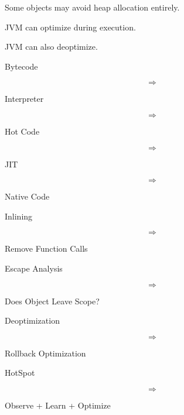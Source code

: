 \documentclass[11pt,a4paper]{book}
\begin{document}

\begin{rosettarule}

Some objects may avoid heap
allocation entirely.

\end{rosettarule}


\begin{rosettarule}

JVM can optimize during execution.

\end{rosettarule}


\begin{rosettarule}

JVM can also deoptimize.

\end{rosettarule}


\begin{compressionbox}

Bytecode

\[
\Rightarrow
\]

Interpreter

\[
\Rightarrow
\]

Hot Code

\[
\Rightarrow
\]

JIT

\[
\Rightarrow
\]

Native Code

\vspace{0.5em}

Inlining

\[
\Rightarrow
\]

Remove Function Calls

\vspace{0.5em}

Escape Analysis

\[
\Rightarrow
\]

Does Object Leave Scope?

\vspace{0.5em}

Deoptimization

\[
\Rightarrow
\]

Rollback Optimization

\vspace{0.5em}

HotSpot

\[
\Rightarrow
\]

Observe + Learn + Optimize

\end{compressionbox}
\end{document}
